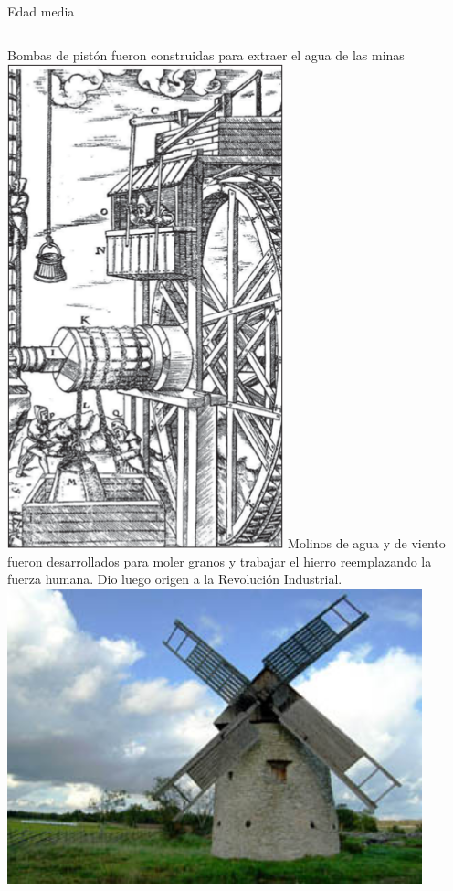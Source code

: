 \documentclass [xcolor=svgnames, t] {beamer}
\begin{document}
\begin{frame}{Edad media}
\begin{columns}
Bombas de pistón fueron construidas para extraer el agua de las minas\\
\centering
\includegraphics[width=0.6\textwidth]{minas}
Molinos de agua y de viento fueron desarrollados para moler granos y trabajar el hierro reemplazando la fuerza humana. Dio luego origen a la Revolución Industrial.\\
\centering
\includegraphics[width=0.9\textwidth]{wind}
\end{columns}
\end{frame}
\end{document}
